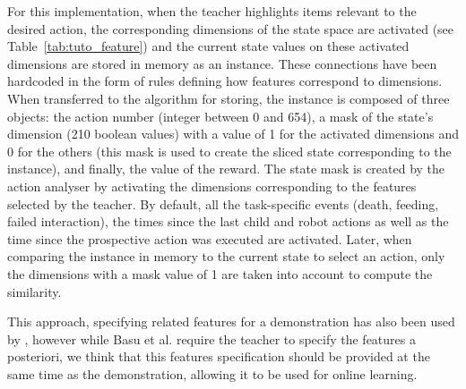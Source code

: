 For this implementation, when the teacher highlights items relevant to the desired action, the corresponding dimensions of the state space are activated (see Table~\ref{tab:tuto_feature}) and the current state values on these activated dimensions are stored in memory as an instance. These connections have been hardcoded in the form of rules defining how features correspond to dimensions.
When transferred to the algorithm for storing, the instance is composed of three objects: the action number (integer between 0 and 654), a mask of the state's dimension (210 boolean values) with a value of 1 for the activated dimensions and 0 for the others (this mask is used to create the sliced state corresponding to the instance), and finally, the value of the reward. The state mask is created by the action analyser by activating the dimensions corresponding to the features selected by the teacher. By default, all the task-specific events (death, feeding, failed interaction), the times since the last child and robot actions as well as the time since the prospective action was executed are activated. Later, when comparing the instance in memory to the current state to select an action, only the dimensions with a mask value of 1 are taken into account to compute the similarity.

This approach, specifying related features for a demonstration has also been used by \cite{basu2018learning}, however while Basu et al. require the teacher to specify the features a posteriori, we think that this features specification should be provided at the same time as the demonstration, allowing it to be used for online learning.

